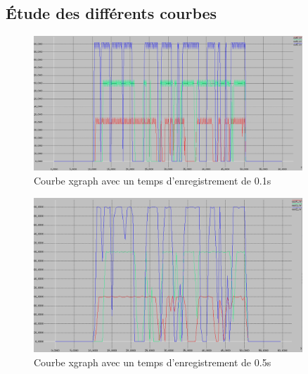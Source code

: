 \documentclass[11pt]{article}
\begin{document}
\subsection{Étude des différents courbes}

\begin{figure}[H]
	\begin{center}
		\includegraphics[width=0.9\textwidth]{assets/tp3/xgraph01s.png}
	\end{center}
	\caption{Courbe xgraph avec un temps d'enregistrement de 0.1s}
	\label{xgrap01s}
\end{figure}

\begin{figure}[H]
	\begin{center}
		\includegraphics[width=0.9\textwidth]{assets/tp3/xgraph05s.png}
	\end{center}
	\caption{Courbe xgraph avec un temps d'enregistrement de 0.5s}
	\label{xgraph05s}
\end{figure}
\end{document}
